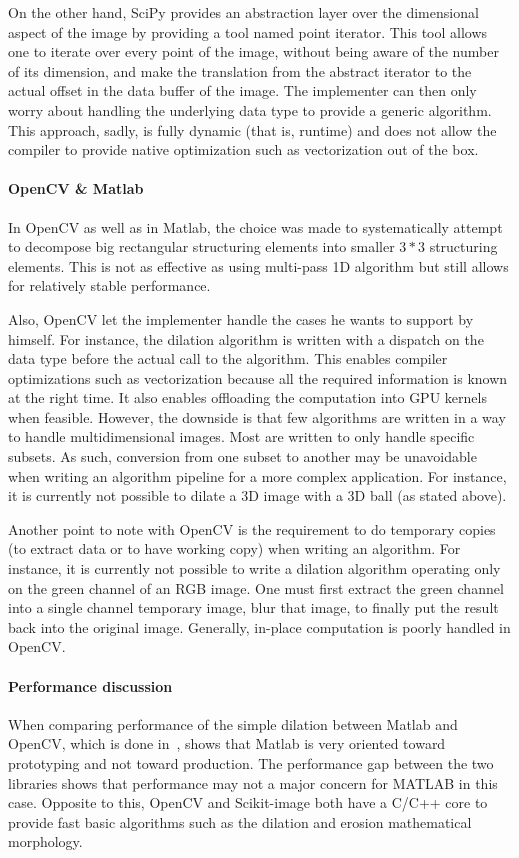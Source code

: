On the other hand, SciPy provides an abstraction layer over the dimensional aspect of the image by providing a tool
named point iterator. This tool allows one to iterate over every point of the image, without being aware of the number
of its dimension, and make the translation from the abstract iterator to the actual offset in the data buffer of the
image. The implementer can then only worry about handling the underlying data type to provide a generic algorithm. This
approach, sadly, is fully dynamic (that is, runtime) and does not allow the compiler to provide native optimization such
as vectorization out of the box.

\paragraph{OpenCV \& Matlab} In OpenCV as well as in Matlab, the choice was made to systematically attempt to decompose
big rectangular structuring elements into smaller \(3*3\) structuring elements. This is not as effective as using
multi-pass 1D algorithm but still allows for relatively stable performance.

Also, OpenCV let the implementer handle the cases he wants to support by himself. For instance, the dilation algorithm
is written with a dispatch on the data type before the actual call to the algorithm. This enables compiler optimizations
such as vectorization because all the required information is known at the right time. It also enables offloading the
computation into GPU kernels when feasible. However, the downside is that few algorithms are written in a way to handle
multidimensional images. Most are written to only handle specific subsets. As such, conversion from one subset to
another may be unavoidable when writing an algorithm pipeline for a more complex application. For instance, it is
currently not possible to dilate a 3D image with a 3D ball (as stated above).

Another point to note with OpenCV is the requirement to do temporary copies (to extract data or to have working copy)
when writing an algorithm. For instance, it is currently not possible to write a dilation algorithm operating only on
the green channel of an RGB image. One must first extract the green channel into a single channel temporary image, blur
that image, to finally put the result back into the original image. Generally, in-place computation is poorly handled in
OpenCV.

\paragraph{Performance discussion} When comparing performance of the simple dilation between Matlab and OpenCV, which
is done in~\parencite{matuska.2012.bench}, shows that Matlab is very oriented toward prototyping and not toward production.
The performance gap between the two libraries shows that performance may not a major concern for MATLAB in this case.
Opposite to this, OpenCV and Scikit-image both have a C/C++ core to provide fast basic algorithms such as the dilation
and erosion mathematical morphology.

